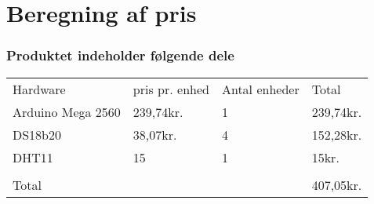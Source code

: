 \section{Beregning af pris}
\subsubsection{Produktet indeholder følgende dele}  



\begin{tabular}{ |p{3cm}||p{3cm}|p{3cm}|p{3cm}|  }
 \hline
 \rowcolor{lightgray}\multicolumn{4}{|c|}{Pris beregning} \\
 \hline
 Hardware    & pris pr. enhed &Antal enheder&Total\\
 \hline
 Arduino Mega 2560   & 239,74kr.    &1&   239,74kr.\\
 \hline
 DS18b20&   38,07kr.  & 4   &152,28kr.\\
 \hline
 DHT11 &15 & 1&  15kr.\\
 \hline
 		&	&	&\\
 \hline
 Total	&	&	&407,05kr.\\
 \hline 
\end{tabular}

